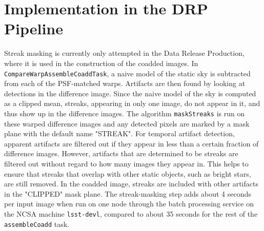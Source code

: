 \documentclass[DM,authoryear,toc]{lsstdoc}
\begin{document}
\section{Implementation in the DRP Pipeline}
\label{sec: implementation}

Streak masking is currently only attempted in the Data Release Production, where it is used in the construction of the coadded images. In \texttt{CompareWarpAssembleCoaddTask}, a naive model of the static sky is subtracted from each of the PSF-matched warps. Artifacts are then found by looking at detections in the difference image. Since the naive model of the sky is computed as a clipped mean, streaks, appearing in only one image, do not appear in it, and thus show up in the difference images. The algorithm \texttt{maskStreaks} is run on these warped difference images and any detected pixels are marked by a mask plane with the default name "STREAK". For temporal artifact detection, apparent artifacts are filtered out if they appear in less than a certain fraction of difference images. However, artifacts that are determined to be streaks are filtered out without regard to how many images they appear in. This helps to ensure that streaks that overlap with other static objects, such as bright stars, are still removed. In the coadded image, streaks are included with other artifacts in the "CLIPPED" mask plane. The streak-masking step adds about 4 seconds per input image when run on one node through the batch processing service on the NCSA machine \texttt{lsst-devl}, compared to about 35 seconds for the rest of the \texttt{assembleCoadd} task.
\end{document}
